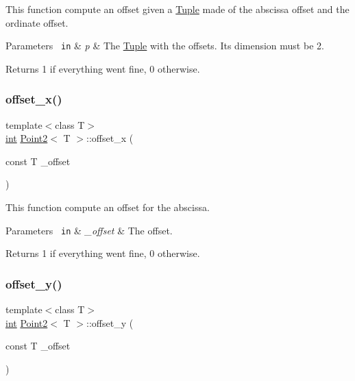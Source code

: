 This function compute an offset given a {\ttfamily \mbox{\hyperlink{class_tuple}{Tuple}}} made of the abscissa offset and the ordinate offset. 


\begin{DoxyParams}[1]{Parameters}
\mbox{\texttt{ in}}  & {\em p} & The {\ttfamily \mbox{\hyperlink{class_tuple}{Tuple}}} with the offsets. Its dimension must be 2. \\
\hline
\end{DoxyParams}
\begin{DoxyReturn}{Returns}
1 if everything went fine, 0 otherwise. 
\end{DoxyReturn}
\mbox{\label{class_point2_a5054bfe0d4f8b38cdc6a375624c388b2}} 
\subsubsection{\texorpdfstring{offset\_x()}{offset\_x()}}
{\footnotesize\ttfamily template$<$class T$>$ \\
\mbox{\hyperlink{draw_8hh_aa620a13339ac3a1177c86edc549fda9b}{int}} \mbox{\hyperlink{class_point2}{Point2}}$<$ T $>$\+::offset\+\_\+x (\begin{DoxyParamCaption}\item[{const T}]{\+\_\+offset }\end{DoxyParamCaption})\hspace{0.3cm}{\ttfamily [inline]}}



This function compute an offset for the abscissa. 


\begin{DoxyParams}[1]{Parameters}
\mbox{\texttt{ in}}  & {\em \+\_\+offset} & The offset. \\
\hline
\end{DoxyParams}
\begin{DoxyReturn}{Returns}
1 if everything went fine, 0 otherwise. 
\end{DoxyReturn}
\mbox{\label{class_point2_a2f976fd1f064746ae5afb97a484afa13}} 
\subsubsection{\texorpdfstring{offset\_y()}{offset\_y()}}
{\footnotesize\ttfamily template$<$class T$>$ \\
\mbox{\hyperlink{draw_8hh_aa620a13339ac3a1177c86edc549fda9b}{int}} \mbox{\hyperlink{class_point2}{Point2}}$<$ T $>$\+::offset\+\_\+y (\begin{DoxyParamCaption}\item[{const T}]{\+\_\+offset }\end{DoxyParamCaption})\hspace{0.3cm}{\ttfamily [inline]}}



